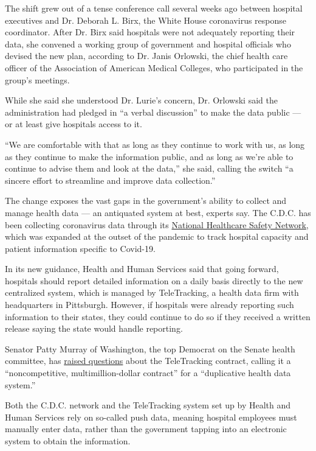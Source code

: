 The shift grew out of a tense conference call several weeks ago between
hospital executives and Dr. Deborah L. Birx, the White House coronavirus
response coordinator. After Dr. Birx said hospitals were not adequately
reporting their data, she convened a working group of government and
hospital officials who devised the new plan, according to Dr. Janis
Orlowski, the chief health care officer of the Association of American
Medical Colleges, who participated in the group's meetings.

While she said she understood Dr. Lurie's concern, Dr. Orlowski said the
administration had pledged in ``a verbal discussion'' to make the data
public --- or at least give hospitals access to it.

``We are comfortable with that as long as they continue to work with us,
as long as they continue to make the information public, and as long as
we're able to continue to advise them and look at the data,'' she said,
calling the switch ``a sincere effort to streamline and improve data
collection.''

The change exposes the vast gaps in the government's ability to collect
and manage health data --- an antiquated system at best, experts say.
The C.D.C. has been collecting coronavirus data through its
\href{https://www.cdc.gov/nhsn/index.html}{National Healthcare Safety
Network}, which was expanded at the outset of the pandemic to track
hospital capacity and patient information specific to Covid-19.

In its new guidance, Health and Human Services said that going forward,
hospitals should report detailed information on a daily basis directly
to the new centralized system, which is managed by TeleTracking, a
health data firm with headquarters in Pittsburgh. However, if hospitals
were already reporting such information to their states, they could
continue to do so if they received a written release saying the state
would handle reporting.

Senator Patty Murray of Washington, the top Democrat on the Senate
health committee, has
\href{https://www.help.senate.gov/ranking/newsroom/press/murray-demands-answers-regarding-non-competitive-multimillion-dollar-contract-for-duplicative-health-data-system-}{raised
questions} about the TeleTracking contract, calling it a
``noncompetitive, multimillion-dollar contract'' for a ``duplicative
health data system.''

Both the C.D.C. network and the TeleTracking system set up by Health and
Human Services rely on so-called push data, meaning hospital employees
must manually enter data, rather than the government tapping into an
electronic system to obtain the information.

